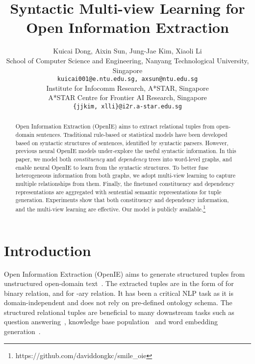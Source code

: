 \documentclass[11pt]{article}
\title{Syntactic Multi-view Learning for Open Information Extraction}
\author{Kuicai Dong, Aixin Sun, Jung-Jae Kim, Xiaoli Li \\
\fontsize{11pt}{12pt}\selectfont
 School of Computer Science and Engineering, Nanyang Technological University, Singapore\\
\fontsize{11pt}{12pt}\selectfont
\texttt{kuicai001@e.ntu.edu.sg, axsun@ntu.edu.sg}\\
\fontsize{11pt}{12pt}\selectfont
 Institute for Infocomm Research, A*STAR, Singapore\\
\fontsize{11pt}{12pt}\selectfont
 A*STAR Centre for Frontier AI Research, Singapore\\
\fontsize{11pt}{12pt}\selectfont
\texttt{\{jjkim, xlli\}@i2r.a-star.edu.sg}}
\begin{document}
\maketitle
\begin{abstract}

Open Information Extraction (OpenIE) aims to extract relational tuples from open-domain sentences. 
Traditional rule-based or statistical models have been developed based on syntactic structures of sentences, identified by syntactic parsers. However, previous neural OpenIE models under-explore the useful syntactic information.
In this paper, we model both \textit{constituency} and \textit{dependency} trees into word-level graphs, and enable neural OpenIE to learn from the syntactic structures. 
To better fuse heterogeneous information from both graphs, we adopt multi-view learning to capture multiple relationships from them. Finally, the finetuned constituency and dependency representations are aggregated with sentential semantic representations for tuple generation. 
Experiments show that both constituency and dependency information, and the multi-view learning are effective. Our model is publicly available.\footnote{https://github.com/daviddongkc/smile\_oie}

\end{abstract}


\section{Introduction}\label{sec:intro}




Open Information Extraction (OpenIE) aims to generate structured tuples from unstructured open-domain text~\cite{yates2007textrunner}.
The extracted tuples are in the form of  for binary relation, and  for -ary relation.
It has been a critical NLP task as it is domain-independent  and does not rely on pre-defined ontology schema. The structured relational tuples are beneficial to many  downstream tasks such as question answering~\cite{khot2017answering}, knowledge base population~\cite{martinez2018openie, gashteovski2020aligning} and word embedding generation~\cite{stanovsky2015open}.
\end{document}
